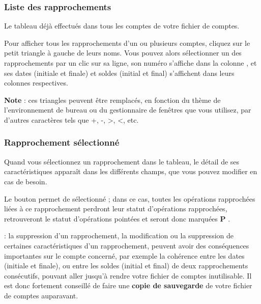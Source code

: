 \subsubsection{Liste des rapprochements}

Le tableau  déjà effectués dans tous les comptes de votre fichier de comptes. 

Pour afficher tous les rapprochements d'un ou plusieurs comptes, cliquez sur le petit triangle à gauche de leurs noms. Vous pouvez alors sélectionner un des rapprochements par un clic sur sa ligne, son numéro s'affiche dans la colonne , et ses dates (initiale et finale) et soldes (initial et final) s'affichent dans leurs colonnes respectives.

\textbf{Note} : ces triangles peuvent être remplacés, en fonction du thème de l'environnement de bureau ou du gestionnaire de fenêtres que vous utilisez, par d'autres caractères tels que +, -, >, <, etc.


\subsubsection{Rapprochement sélectionné}

Quand vous sélectionnez un rapprochement dans le tableau, le détail de ses caractéristiques apparaît dans les différents champs, que vous pouvez modifier en cas de besoin.

Le bouton  permet de  sélectionné ; dans ce cas, toutes les opérations rapprochées liées à ce rapprochement perdront leur statut d'opérations rapprochées, retrouveront le statut d'opérations pointées et seront donc marquées \og \textbf{P} \fg{}. 

 : la suppression d'un rapprochement, la modification ou la suppression de certaines caractéristiques d'un rapprochement, peuvent avoir des conséquences importantes sur le compte concerné, par exemple la cohérence entre les dates (initiale et finale), ou entre les soldes (initial et final) de deux rapprochements consécutifs, pouvant aller jusqu'à rendre votre fichier de comptes inutilisable. Il est donc fortement conseillé de faire une \textbf{copie de sauvegarde} de votre fichier de comptes auparavant.

